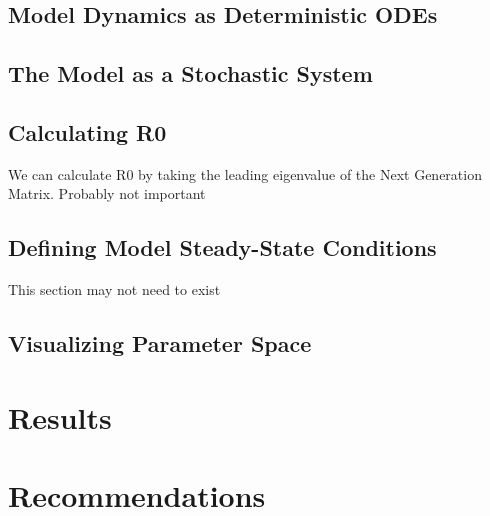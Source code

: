 \documentclass[11pt, a4paper]{article}
\begin{document}
  \subsection{Model Dynamics as Deterministic ODEs}
  
  \subsection{The Model as a Stochastic System}
  
  \subsection{Calculating R0}
  We can calculate R0 by taking the leading eigenvalue of the Next Generation Matrix.
  Probably not important
  \clearpage
  \subsection{Defining Model Steady-State Conditions}
  This section may not need to exist
  \clearpage
  \subsection{Visualizing Parameter Space}
  
\section{Results}

\section{Recommendations}

{}

\end{document}
